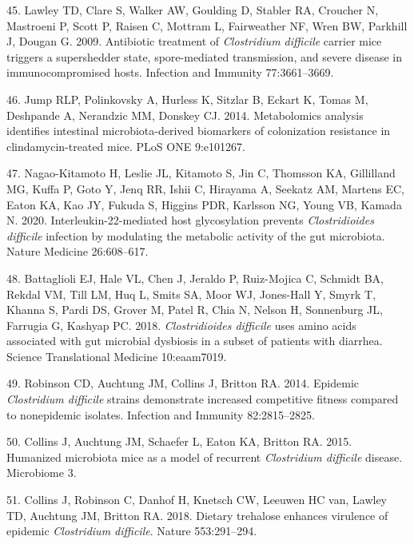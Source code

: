 \documentclass[
  11pt,
]{article}
\begin{document}
\leavevmode\hypertarget{ref-Lawley2009}{}%
45. Lawley TD, Clare S, Walker AW, Goulding D, Stabler RA, Croucher N,
Mastroeni P, Scott P, Raisen C, Mottram L, Fairweather NF, Wren BW,
Parkhill J, Dougan G. 2009. Antibiotic treatment of \emph{Clostridium
difficile} carrier mice triggers a supershedder state, spore-mediated
transmission, and severe disease in immunocompromised hosts. Infection
and Immunity 77:3661--3669.

\leavevmode\hypertarget{ref-Jump2014}{}%
46. Jump RLP, Polinkovsky A, Hurless K, Sitzlar B, Eckart K, Tomas M,
Deshpande A, Nerandzic MM, Donskey CJ. 2014. Metabolomics analysis
identifies intestinal microbiota-derived biomarkers of colonization
resistance in clindamycin-treated mice. PLoS ONE 9:e101267.

\leavevmode\hypertarget{ref-NagaoKitamoto2020}{}%
47. Nagao-Kitamoto H, Leslie JL, Kitamoto S, Jin C, Thomsson KA,
Gillilland MG, Kuffa P, Goto Y, Jenq RR, Ishii C, Hirayama A, Seekatz
AM, Martens EC, Eaton KA, Kao JY, Fukuda S, Higgins PDR, Karlsson NG,
Young VB, Kamada N. 2020. Interleukin-22-mediated host glycosylation
prevents \emph{Clostridioides difficile} infection by modulating the
metabolic activity of the gut microbiota. Nature Medicine 26:608--617.

\leavevmode\hypertarget{ref-Battaglioli2018}{}%
48. Battaglioli EJ, Hale VL, Chen J, Jeraldo P, Ruiz-Mojica C, Schmidt
BA, Rekdal VM, Till LM, Huq L, Smits SA, Moor WJ, Jones-Hall Y, Smyrk T,
Khanna S, Pardi DS, Grover M, Patel R, Chia N, Nelson H, Sonnenburg JL,
Farrugia G, Kashyap PC. 2018. \emph{Clostridioides difficile} uses amino
acids associated with gut microbial dysbiosis in a subset of patients
with diarrhea. Science Translational Medicine 10:eaam7019.

\leavevmode\hypertarget{ref-Robinson2014}{}%
49. Robinson CD, Auchtung JM, Collins J, Britton RA. 2014. Epidemic
\emph{Clostridium difficile} strains demonstrate increased competitive
fitness compared to nonepidemic isolates. Infection and Immunity
82:2815--2825.

\leavevmode\hypertarget{ref-Collins2015}{}%
50. Collins J, Auchtung JM, Schaefer L, Eaton KA, Britton RA. 2015.
Humanized microbiota mice as a model of recurrent \emph{Clostridium
difficile} disease. Microbiome 3.

\leavevmode\hypertarget{ref-Collins2018}{}%
51. Collins J, Robinson C, Danhof H, Knetsch CW, Leeuwen HC van, Lawley
TD, Auchtung JM, Britton RA. 2018. Dietary trehalose enhances virulence
of epidemic \emph{Clostridium difficile}. Nature 553:291--294.
\end{document}
